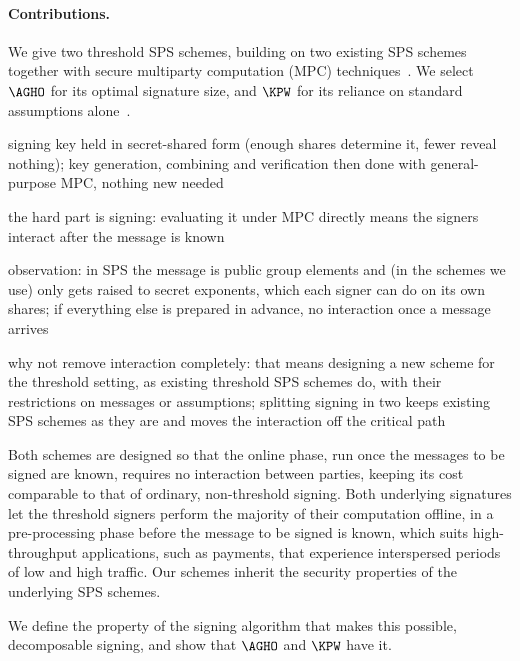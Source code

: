 \paragraph{Contributions.} We give two threshold SPS schemes, building on two
existing SPS schemes together with secure multiparty computation (MPC)
techniques~\cite{C:AGHO11,C:KilPanWee15,C:DPSZ12,CCS:KelOrsSch16,C:GLOPS21}.
We select $\AGHO$ for its optimal signature size, and $\KPW$ for its reliance
on standard assumptions alone~\cite{C:AGHO11,C:KilPanWee15}.

\begin{outline}
  \item signing key held in secret-shared form (enough shares determine it, fewer
reveal nothing); key generation, combining and verification then done with
general-purpose MPC, nothing new needed
  \item the hard part is signing: evaluating it under MPC directly means the
signers interact after the message is known
  \item observation: in SPS the message is public group elements and (in the
schemes we use) only gets raised to secret exponents, which each signer can do on
its own shares; if everything else is prepared in advance, no interaction once a
message arrives
  \item why not remove interaction completely: that means designing a new scheme
for the threshold setting, as existing threshold SPS schemes do, with their
restrictions on messages or assumptions; splitting signing in two keeps existing
SPS schemes as they are and moves the interaction off the critical path
\end{outline}

Both schemes are designed so that the online phase, run once the messages to be
signed are known, requires no interaction between parties, keeping its cost
comparable to that of ordinary, non-threshold signing. Both underlying
signatures let the threshold signers perform the majority of their computation
offline, in a pre-processing phase before the message to be signed is known,
which suits high-throughput applications, such as payments, that experience
interspersed periods of low and high traffic. Our schemes inherit the security
properties of the underlying SPS schemes.

We define the property of the signing algorithm that makes this possible,
decomposable signing, and show that $\AGHO$ and $\KPW$ have it.

